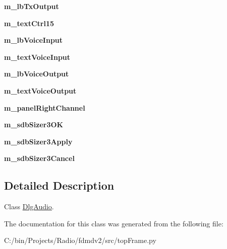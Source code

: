 \begin{DoxyCompactItemize}
\item 
\hypertarget{classtop_frame_1_1_dlg_audio_a71fad20ce38522a3d7fdf382bac574eb}{{\bfseries m\-\_\-lb\-Tx\-Output}}\label{classtop_frame_1_1_dlg_audio_a71fad20ce38522a3d7fdf382bac574eb}

\item 
\hypertarget{classtop_frame_1_1_dlg_audio_ac2f717412a50f5cd89b9d0a59017bf15}{{\bfseries m\-\_\-text\-Ctrl15}}\label{classtop_frame_1_1_dlg_audio_ac2f717412a50f5cd89b9d0a59017bf15}

\item 
\hypertarget{classtop_frame_1_1_dlg_audio_ac9bd58efb64f6a5d0321a90dfe513b9f}{{\bfseries m\-\_\-lb\-Voice\-Input}}\label{classtop_frame_1_1_dlg_audio_ac9bd58efb64f6a5d0321a90dfe513b9f}

\item 
\hypertarget{classtop_frame_1_1_dlg_audio_a9482d146d43bbce0a799a3da1dd4ad0d}{{\bfseries m\-\_\-text\-Voice\-Input}}\label{classtop_frame_1_1_dlg_audio_a9482d146d43bbce0a799a3da1dd4ad0d}

\item 
\hypertarget{classtop_frame_1_1_dlg_audio_a6c4209a69a20cf63cfacff12a157bed1}{{\bfseries m\-\_\-lb\-Voice\-Output}}\label{classtop_frame_1_1_dlg_audio_a6c4209a69a20cf63cfacff12a157bed1}

\item 
\hypertarget{classtop_frame_1_1_dlg_audio_a9ae504c996b2ce07cf6527ab3aca6cd0}{{\bfseries m\-\_\-text\-Voice\-Output}}\label{classtop_frame_1_1_dlg_audio_a9ae504c996b2ce07cf6527ab3aca6cd0}

\item 
\hypertarget{classtop_frame_1_1_dlg_audio_a0280c445b4ade90d302a4afd83ae1256}{{\bfseries m\-\_\-panel\-Right\-Channel}}\label{classtop_frame_1_1_dlg_audio_a0280c445b4ade90d302a4afd83ae1256}

\item 
\hypertarget{classtop_frame_1_1_dlg_audio_aa65de832c1293d83a4d9850ee27b171b}{{\bfseries m\-\_\-sdb\-Sizer3\-O\-K}}\label{classtop_frame_1_1_dlg_audio_aa65de832c1293d83a4d9850ee27b171b}

\item 
\hypertarget{classtop_frame_1_1_dlg_audio_a38ef9c9e99dd4334c9350ffa6cb9ea88}{{\bfseries m\-\_\-sdb\-Sizer3\-Apply}}\label{classtop_frame_1_1_dlg_audio_a38ef9c9e99dd4334c9350ffa6cb9ea88}

\item 
\hypertarget{classtop_frame_1_1_dlg_audio_a7add09e92b8ef21c2eca492da8a8e175}{{\bfseries m\-\_\-sdb\-Sizer3\-Cancel}}\label{classtop_frame_1_1_dlg_audio_a7add09e92b8ef21c2eca492da8a8e175}

\end{DoxyCompactItemize}


\subsection{Detailed Description}
Class \hyperlink{classtop_frame_1_1_dlg_audio}{Dlg\-Audio}. 

The documentation for this class was generated from the following file\-:\begin{DoxyCompactItemize}
\item 
C\-:/bin/\-Projects/\-Radio/fdmdv2/src/top\-Frame.\-py\end{DoxyCompactItemize}
